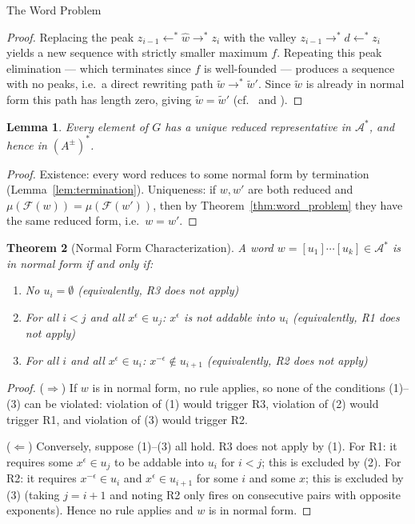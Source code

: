 \documentclass{article}
\newtheorem{theorem}{Theorem}[section]
\newtheorem{lemma}[theorem]{Lemma}
\theoremstyle{definition}
\theoremstyle{remark}
\theoremstyle{theorem}
\theoremstyle{definition}
\begin{document}
\begin{section}{The Word Problem}
\begin{proof}
Replacing the peak $z_{i-1}\leftarrow^*\hat{w}\to^* z_i$ with the valley
$z_{i-1}\to^* d\leftarrow^* z_i$ yields a new sequence with strictly
smaller maximum $f$. Repeating this peak elimination --- which terminates
since $f$ is well-founded --- produces a sequence with no peaks, i.e.\ a
direct rewriting path $\tilde{w}\to^*\tilde{w}'$. Since $\tilde{w}$ is
already in normal form this path has length zero, giving
$\tilde{w}=\tilde{w}'$ (cf.\ \cite{Sims} \cite{MKS} and \cite{BO93}).

\end{proof}


\begin{lemma}
    Every element of $G$ has a unique reduced representative in $\mathcal{A}^*$, and hence in $(A^{\pm})^*$.
\end{lemma}
\begin{proof}
Existence: every word reduces to some normal form by termination (Lemma~\ref{lem:termination}). Uniqueness: if $w, w'$ are both reduced and $\mu(\mathcal{F}(w)) = \mu(\mathcal{F}(w'))$, then by Theorem~\ref{thm:word_problem} they have the same reduced form, i.e.\ $w = w'$.
\end{proof}

\begin{theorem}[Normal Form Characterization]\label{thm:normal_form}
A word $w = [u_1] \cdots [u_k] \in \mathcal{A}^*$ is in normal form if and only if:
\begin{enumerate}
    \item No $u_i = \emptyset$ \quad (equivalently, R3 does not apply)
    \item For all $i < j$ and all $x^{\epsilon} \in u_j$: $x^{\epsilon}$ is not addable into $u_i$ \quad (equivalently, R1 does not apply)
    \item For all $i$ and all $x^{\epsilon} \in u_i$: $x^{-\epsilon} \notin u_{i+1}$ \quad (equivalently, R2 does not apply)
\end{enumerate}
\end{theorem}

\begin{proof}
($\Rightarrow$) If $w$ is in normal form, no rule applies, so none of the
conditions (1)--(3) can be violated: violation of (1) would trigger R3,
violation of (2) would trigger R1, and violation of (3) would trigger R2.

($\Leftarrow$) Conversely, suppose (1)--(3) all hold. R3 does not apply by
(1). For R1: it requires some $x^\epsilon \in u_j$ to be addable into $u_i$
for $i < j$; this is excluded by (2). For R2: it requires $x^{-\epsilon} \in
u_i$ and $x^\epsilon \in u_{i+1}$ for some $i$ and some $x$; this is excluded
by (3) (taking $j = i+1$ and noting R2 only fires on consecutive pairs with
opposite exponents). Hence no rule applies and $w$ is in normal form.
\end{proof}


\end{section}
\end{document}

